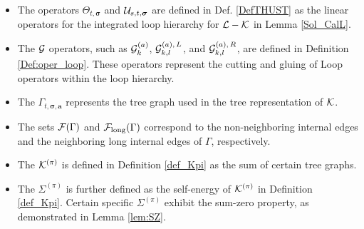 \documentclass[10pt,reqno]{article}
\theoremstyle{plain} %
\theoremstyle{remark}
\numberwithin{equation}{section}
\begin{document}
\begin{itemize}
    \begin{align}
\Xi^{({\cal L})}_{t, m}&:= \max_{\boldsymbol{\sigma}, \textbf{a}} 
\left|{\cal L}_{t, \boldsymbol{\sigma}, \textbf{a}} \right|\cdot \left(W\ell_t \eta_t\right)^{m-1} \cdot {\bf 1}(\sigma \in \{+,-\}^m),
\nonumber \\
\Xi^{({\cal L-K})}_{t, m}&:= \max_{\boldsymbol{\sigma}, \textbf{a}}
\left|{ ({\cal L-K})}_{t, \boldsymbol{\sigma}, \textbf{a}} \right|\cdot \left(W\ell_t \eta_t\right)^{m }\cdot {\bf 1}(\sigma \in \{+,-\}^m) ,
\nonumber \\
\Xi^{({{\cal C},\;diag })}_{t, m} &:= \max_{\boldsymbol{\sigma}, \textbf{a}} \max_i \left|\left({\cal C}^{(m)}_{t, \boldsymbol{\sigma}, \textbf{a}}\right)_{ii}\right| \cdot \left(W\ell_t \eta_t\right)^{m-1} \cdot {\bf 1}(\sigma \in \{+,-\}^m), \nonumber \\
\Xi^{({{\cal C},\;off})}_{t, m} &:= \max_{\boldsymbol{\sigma}, \textbf{a}} \max_{i \neq j}
\left|\left({\cal C}^{(m)}_{t, \boldsymbol{\sigma}, \textbf{a}}\right)_{ij}\right| \cdot \left(W\ell_t \eta_t\right)^{m-1/2} \cdot {\bf 1}(\sigma \in \{+,-\}^m).
\end{align}
\item The operators $\varTheta_{t,\boldsymbol{\sigma}}$ and ${\cal U}_{s, t,\boldsymbol{\sigma}}$ are defined in Def. \ref{DefTHUST} as the linear operators for the integrated loop hierarchy for $\cal L-\cal K$ in Lemma \ref{Sol_CalL}. 
\item  The \(\cal G\) operators, such as \({\cal G}^{(a)}_k\), \({\cal G}^{(a),\,L}_{k,l}\), and \({\cal G}^{(a),\,R}_{k,l}\), are defined in Definition \ref{Def:oper_loop}. These operators represent the cutting and gluing of Loop operators within the loop hierarchy.
 

\item The \(\Gamma_{t,\boldsymbol{\sigma}, \textbf{a}}\) represents the tree graph used in the tree representation of \(\cal K\). 
\item  The sets \({\cal F}(\Gamma)\) and \({\cal F}_{\text{long}}(\Gamma)\) correspond to the non-neighboring internal edges and the neighboring long internal edges of $\Gamma$, respectively.

\item The \({\cal K}^{(\pi)}\) is defined in Definition \ref{def_Kpi} as the sum of certain tree graphs. 
\item The \(\Sigma^{(\pi)}\) is further defined as the self-energy of \({\cal K}^{(\pi)}\) in Definition \ref{def_Kpi}. Certain specific \(\Sigma^{(\pi)}\) exhibit the sum-zero property, as demonstrated in Lemma \ref{lem:SZ}.
 

\end{itemize}
\end{document}
